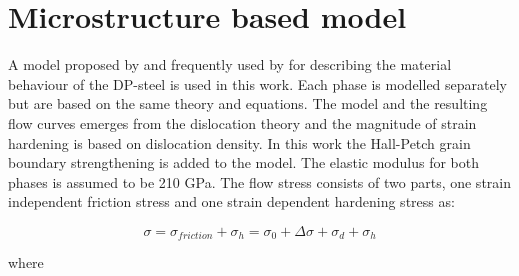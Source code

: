 \documentclass{article}
\begin{document}
\section{Microstructure based model}
\label{Micromodel}
A model proposed by \cite{Gutierrez} and frequently used by \cite{Ramazani} for describing the material behaviour of the DP-steel is used in this work. Each phase is modelled separately but are based on the same theory and equations. The model and the resulting flow curves emerges from the dislocation theory and the magnitude of strain hardening is based on dislocation density. In this work the Hall-Petch grain boundary strengthening is added to the model. The elastic modulus for both phases is assumed to be 210 GPa. The flow stress consists of two parts, one strain independent friction stress and one strain dependent hardening stress as:

\begin{equation}
   \sigma = \sigma_{friction} + \sigma_h = \sigma_0 + \Delta\sigma + \sigma_d + \sigma_h
   \label{Eq:Flowstress}
\end{equation}

where 
\end{document}

